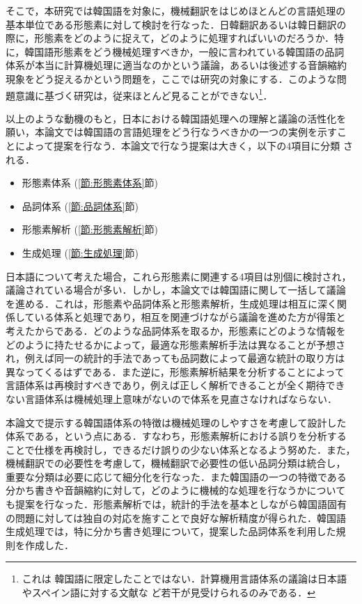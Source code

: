 そこで，本研究では韓国語を対象に，機械翻訳をはじめほとんどの言語処理の
基本単位である形態素に対して検討を行なった．日韓翻訳あるいは韓日翻訳の
際に，形態素をどのように捉えて，どのように処理すればいいのだろうか．特
に，韓国語形態素をどう機械処理すべきか，一般に言われている韓国語の品詞
体系が本当に計算機処理に適当なのかという議論，あるいは後述する音韻縮約
現象をどう捉えるかという問題を，ここでは研究の対象にする．このような問
題意識に基づく研究は，従来ほとんど見ることができない{}\footnote{これは
韓国語に限定したことではない．計算機用言語体系の議論は日本語\cite{渕文
法}\cite{宮崎文法}やスペイン語\cite{スペイン語品詞体系}に対する文献な
ど若干が見受けられるのみである．}．

以上のような動機のもと，日本における韓国語処理への理解と議論の活性化を
願い，本論文では韓国語の言語処理をどう行なうべきかの一つの実例を示すこ
とによって提案を行なう．本論文で行なう提案は大きく，以下の4項目に分類
される．

\begin{itemize}
\item 形態素体系 (\ref{節:形態素体系}節)
\item 品詞体系 (\ref{節:品詞体系}節)
\item 形態素解析 (\ref{節:形態素解析}節)
\item 生成処理 (\ref{節:生成処理}節)
\end{itemize}

日本語について考えた場合，これら形態素に関連する4項目は別個に検討され，
議論されている場合が多い．しかし，本論文では韓国語に関して一括して議論
を進める．これは，形態素や品詞体系と形態素解析，生成処理は相互に深く関
係している体系と処理であり，相互を関連づけながら議論を進めた方が得策と
考えたからである．どのような品詞体系を取るか，形態素にどのような情報を
どのように持たせるかによって，最適な形態素解析手法は異なることが予想さ
れ，例えば同一の統計的手法であっても品詞数によって最適な統計の取り方は
異なってくるはずである．また逆に，形態素解析結果を分析することによって
言語体系は再検討すべきであり，例えば正しく解析できることが全く期待でき
ない言語体系は機械処理上意味がないので体系を見直さなければならない．

本論文で提示する韓国語体系の特徴は機械処理のしやすさを考慮して設計した
体系である，という点にある．すなわち，形態素解析における誤りを分析する
ことで仕様を再検討し，できるだけ誤りの少ない体系となるよう努めた．また，
機械翻訳での必要性を考慮して，機械翻訳で必要性の低い品詞分類は統合し，
重要な分類は必要に応じて細分化を行なった．また韓国語の一つの特徴である
分かち書きや音韻縮約に対して，どのように機械的な処理を行なうかについて
も提案を行なった．形態素解析では，統計的手法を基本としながら韓国語固有
の問題に対しては独自の対応を施すことで良好な解析精度が得られた．韓国語
生成処理では，特に分かち書き処理について，提案した品詞体系を利用した規
則を作成した．

